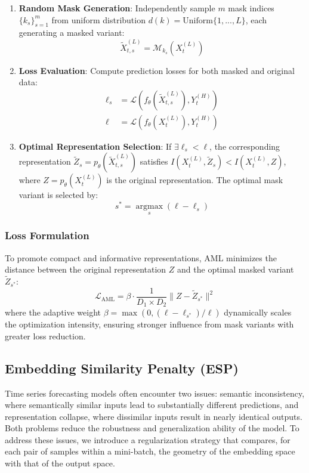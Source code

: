 \documentclass{article}
\begin{document}
\begin{enumerate}[leftmargin=*,noitemsep]
    \item \textbf{Random Mask Generation}: Independently sample $m$ mask indices $\{k_s\}_{s=1}^m$ from uniform distribution $d(k)=\text{Uniform}\{1,...,L\}$, each generating a masked variant:
    \begin{equation}
        \widetilde{X}_{t,s}^{(L)} = \mathcal{M}_{k_s}(X_t^{(L)})
    \end{equation}
    
    \item \textbf{Loss Evaluation}: Compute prediction losses for both masked and original data:
    \begin{align}
        \ell_s &= \mathcal{L}(f_\theta(\widetilde{X}_{t,s}^{(L)}), Y_t^{(H)}) \\
        \ell &= \mathcal{L}(f_\theta(X_t^{(L)}), Y_t^{(H)})
    \end{align}
    
    \item \textbf{Optimal Representation Selection}: If $\exists \ell_s < \ell$, the corresponding representation $\widetilde{Z}_s = p_\theta(\widetilde{X}_{t,s}^{(L)})$ satisfies $I(X_t^{(L)}, \widetilde{Z}_s) < I(X_t^{(L)}, Z)$, where $Z = p_\theta(X_t^{(L)})$ is the original representation. The optimal mask variant is selected by:
    \begin{equation}
        s^* = \mathop{\arg\max}\limits_{s} (\ell - \ell_s)
    \end{equation}
\end{enumerate}

\subsubsection{Loss Formulation}
To promote compact and informative representations, AML minimizes the distance between the original representation $Z$ and the optimal masked variant $\widetilde{Z}_{s^*}$:
\begin{equation}
    \mathcal{L}_{\mathrm{AML}} = \beta \cdot \frac{1}{D_1 \times D_2} \| Z - \widetilde{Z}_{s^*} \|^2
\end{equation}
where the adaptive weight $\beta = \max (0, (\ell - \ell_{s^*}) / \ell)$ dynamically scales the optimization intensity, ensuring stronger influence from mask variants with greater loss reduction.

\subsection{Embedding Similarity Penalty (ESP)}
\label{sec:esp}
Time series forecasting models often encounter two issues: semantic inconsistency, where semantically similar inputs lead to substantially different predictions, and representation collapse, where dissimilar inputs result in nearly identical outputs. Both problems reduce the robustness and generalization ability of the model. To address these issues, we introduce a regularization strategy that compares, for each pair of samples within a mini-batch, the geometry of the embedding space with that of the output space.
\end{document}
